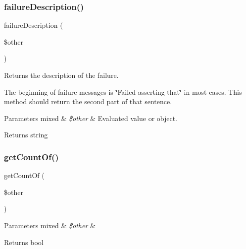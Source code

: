 \subsubsection{\texorpdfstring{failure\+Description()}{failureDescription()}}
{\footnotesize\ttfamily failure\+Description (\begin{DoxyParamCaption}\item[{}]{\$other }\end{DoxyParamCaption})\hspace{0.3cm}{\ttfamily [protected]}}

Returns the description of the failure.

The beginning of failure messages is \char`\"{}\+Failed asserting that\char`\"{} in most cases. This method should return the second part of that sentence.


\begin{DoxyParams}[1]{Parameters}
mixed & {\em \$other} & Evaluated value or object.\\
\hline
\end{DoxyParams}
\begin{DoxyReturn}{Returns}
string 
\end{DoxyReturn}
\mbox{\label{class_p_h_p_unit___framework___constraint___count_a0adcb17f65887a062d9c917df50df31e}} 
\subsubsection{\texorpdfstring{get\+Count\+Of()}{getCountOf()}}
{\footnotesize\ttfamily get\+Count\+Of (\begin{DoxyParamCaption}\item[{}]{\$other }\end{DoxyParamCaption})\hspace{0.3cm}{\ttfamily [protected]}}


\begin{DoxyParams}[1]{Parameters}
mixed & {\em \$other} & \\
\hline
\end{DoxyParams}
\begin{DoxyReturn}{Returns}
bool 
\end{DoxyReturn}
\mbox{\label{class_p_h_p_unit___framework___constraint___count_a4a85c1bf3d9b3569fac810b3114f8167}} 
